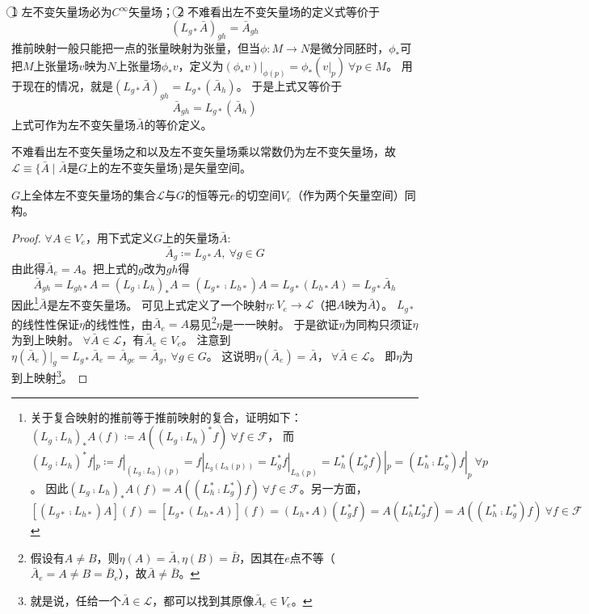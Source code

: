 \begin{note}
    \textcircled{1} 左不变矢量场必为$C^\infty$矢量场；
    \textcircled{2} 不难看出左不变矢量场的定义式等价于
    $$(L_{g*}\bar A)_{gh} = \bar A_{gh}$$
    推前映射一般只能把一点的张量映射为张量，但当$\phi \colon M \to N$是微分同胚时，$\phi_*$可把$M$上张量场$v$映为$N$上张量场$\phi_*v$，定义为$(\phi_*v)|_{\phi(p)} = \phi_*(v|_p) ~ \forall p \in M$。
    用于现在的情况，就是$(L_{g*}\bar A)_{gh} = L_{g*}(\bar A_h)$。
    于是上式又等价于$$\bar A_{gh} = L_{g*}(\bar A_h)$$
    上式可作为左不变矢量场$\bar A$的等价定义。
\end{note}

不难看出左不变矢量场之和以及左不变矢量场乘以常数仍为左不变矢量场，故$\mathscr{L} \equiv \{\bar A \mid \bar A \text{是$G$上的左不变矢量场}\}$是矢量空间。

\begin{theorem}
    $G$上全体左不变矢量场的集合$\mathscr{L}$与$G$的恒等元$e$的切空间$V_e$（作为两个矢量空间）同构。
\end{theorem}

\begin{proof}
    $\forall A \in V_e$，用下式定义$G$上的矢量场$\bar A$:
    $$\bar A_g \coloneq L_{g*}A, ~ \forall g \in G$$
    由此得$\bar A_e = A$。把上式的$g$改为$gh$得
    $$\bar A_{gh} = L_{gh*}A = (L_g \comp L_h)_*A = (L_{g*} \comp L_{h*})A = L_{g*}(L_{h*}A) = L_{g*}\bar A_h$$
    因此\footnote{
        关于复合映射的推前等于推前映射的复合，证明如下：
        $(L_g \comp L_h)_*A(f) \coloneq A((L_g \comp L_h)^*f) ~ \forall f \in \mathscr{F}$，
        而$(L_g \comp L_h)^*f|_p \coloneq f|_{(L_g \comp L_h)(p)} = f|_{L_g(L_h(p))} = L_g^*f|_{L_h(p)} = L_h^*(L_g^*f)|_p = (L_h^* \comp L_g^*)f|_p ~ \forall p$。
        因此$(L_g \comp L_h)_*A(f) = A((L_h^* \comp L_g^*)f) ~ \forall f \in \mathscr{F}$。另一方面，$[(L_{g*} \comp L_{h*})A](f) = [L_{g*}(L_{h*}A)](f) = (L_{h*}A)(L_g^*f) = A(L_h^*L_g^*f) = A((L_h^* \comp L_g^*)f) ~ \forall f \in \mathscr{F}$
    }$\bar A$是左不变矢量场。
    可见上式定义了一个映射$\eta \colon V_e \to \mathscr{L}$（把$A$映为$\bar A$）。
    $L_{g*}$的线性性保证$\eta$的线性性，由$\bar A_e = A$易见\footnote{
        假设有$A \neq B$，则$\eta(A) = \bar A, \eta(B) = \bar B$，因其在$e$点不等（$\bar A_e = A \neq B = \bar B_e$），故$\bar A \neq \bar B$。
    }$\eta$是一一映射。
    于是欲证$\eta$为同构只须证$\eta$为到上映射。
    $\forall \bar A \in \mathscr{L}$，有$\bar A_e \in V_e$。
    注意到$\eta(\bar A_e)|_g = L_{g*}\bar A_e = \bar A_{ge} = \bar A_g, ~ \forall g \in G$。
    这说明$\eta(\bar A_e) = \bar A， ~ \forall \bar A \in \mathscr{L}$。
    即$\eta$为到上映射\footnote{
        就是说，任给一个$\bar A \in \mathscr{L}$，都可以找到其原像$\bar A_e \in V_e$。
    }。
\end{proof}

